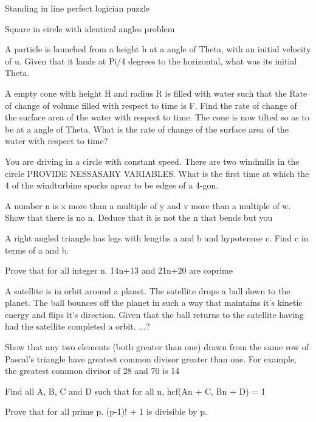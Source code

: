 Standing in line perfect logician puzzle

Square in circle with identical angles problem

A particle is launched from a height h at a angle of Theta, with an initial velocity of u. Given that it lands at Pi/4 degrees to the horizontal, what was its initial Theta.

A empty cone with height H and radius R is filled with water such that the
 Rate of change of volume filled with respect to time is F. Find the rate of change of the surface area of the water with respect to time. The cone is now tilted so as to be at a angle of Theta. What is the rate of change of the surface area of the water with respect to time?

You are driving in a circle with constant speed. There are two windmills in the circle PROVIDE NESSASARY VARIABLES. What is the first time at which the 4 of the windturbine sporks apear to be edges of a 4-gon.

A number n is x more than a multiple of y and v more than a multiple of w. Show that there is no n. Deduce that it is not the n that bends but you

A right angled triangle has legs with lengths a and b and hypotenuse c. Find c in terms of a and b.

Prove that for all integer n. 14n+13 and 21n+20 are coprime

A satellite is in orbit around a planet. The satellite drops a ball down to the planet. The ball bounces off the planet in such a way that maintains it’s kinetic energy and flips it’s direction. Given that the ball returns to the satellite having had the satellite completed a orbit. ...?

Show that any two elements (both greater than one) drawn from the same row of Pascal's triangle have greatest common divisor greater than one.  For example, the greatest common divisor of 28 and 70 is 14

Find all A, B, C and D such that for all n, hcf(An + C, Bn + D) = 1

Prove that for all prime p. (p-1)! + 1 is divisible by p.